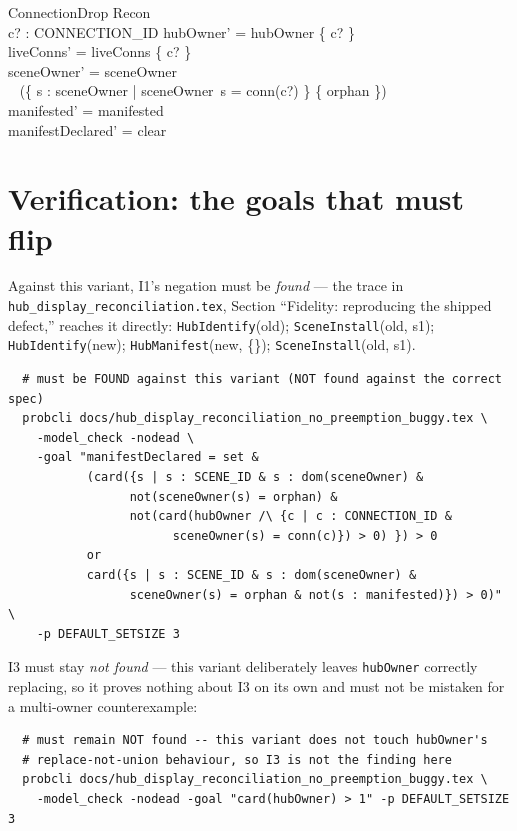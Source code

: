 \documentclass[a4paper,10pt,fleqn]{article}
\begin{document}
\begin{schema}{ConnectionDrop}
  \Delta Recon \\
  c? : CONNECTION\_ID
\where
  hubOwner' = hubOwner \setminus \{ c? \} \\
  liveConns' = liveConns \setminus \{ c? \} \\
  sceneOwner' = sceneOwner \oplus \\
  \quad~ (\{ s : \dom sceneOwner | sceneOwner~s = conn(c?) \} \cross \{ orphan \}) \\
  manifested' = manifested \\
  manifestDeclared' = clear
\end{schema}

\section{Verification: the goals that must flip}

Against this variant, I1's negation must be \emph{found} --- the trace in
\texttt{hub\_display\_reconciliation.tex}, Section ``Fidelity: reproducing
the shipped defect,'' reaches it directly:
\texttt{HubIdentify}(old); \texttt{SceneInstall}(old, s1);
\texttt{HubIdentify}(new); \texttt{HubManifest}(new, \{\});
\texttt{SceneInstall}(old, s1).
\begin{verbatim}
  # must be FOUND against this variant (NOT found against the correct spec)
  probcli docs/hub_display_reconciliation_no_preemption_buggy.tex \
    -model_check -nodead \
    -goal "manifestDeclared = set &
           (card({s | s : SCENE_ID & s : dom(sceneOwner) &
                 not(sceneOwner(s) = orphan) &
                 not(card(hubOwner /\ {c | c : CONNECTION_ID &
                       sceneOwner(s) = conn(c)}) > 0) }) > 0
           or
           card({s | s : SCENE_ID & s : dom(sceneOwner) &
                 sceneOwner(s) = orphan & not(s : manifested)}) > 0)" \
    -p DEFAULT_SETSIZE 3
\end{verbatim}

I3 must stay \emph{not found} --- this variant deliberately leaves
\texttt{hubOwner} correctly replacing, so it proves nothing about I3 on
its own and must not be mistaken for a multi-owner counterexample:
\begin{verbatim}
  # must remain NOT found -- this variant does not touch hubOwner's
  # replace-not-union behaviour, so I3 is not the finding here
  probcli docs/hub_display_reconciliation_no_preemption_buggy.tex \
    -model_check -nodead -goal "card(hubOwner) > 1" -p DEFAULT_SETSIZE 3
\end{verbatim}
\end{document}
